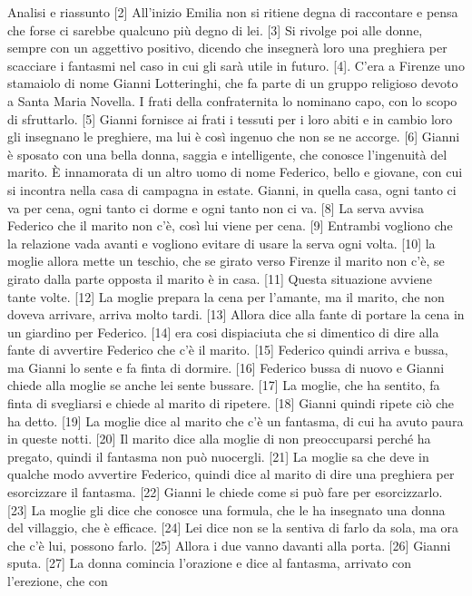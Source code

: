 \documentclass[preview]{standalone}
\begin{document}
Analisi e riassunto
[2] All'inizio Emilia non si ritiene degna di raccontare e pensa che forse ci sarebbe
qualcuno più degno di lei. [3] Si rivolge poi alle donne, sempre con un aggettivo positivo,
dicendo che insegnerà loro una preghiera per scacciare i fantasmi nel caso in cui gli sarà
utile in futuro. [4]. C'era a Firenze uno stamaiolo di nome Gianni Lotteringhi, che fa parte di
un gruppo religioso devoto a Santa Maria Novella. I frati della confraternita lo nominano
capo, con lo scopo di sfruttarlo. [5] Gianni fornisce ai frati i tessuti per i loro abiti e in
cambio loro gli insegnano le preghiere, ma lui è così ingenuo che non se ne accorge. [6]
Gianni è sposato con una bella donna, saggia e intelligente, che conosce l'ingenuità del
marito. È innamorata di un altro uomo di nome Federico, bello e giovane, con cui si
incontra nella casa di campagna in estate. Gianni, in quella casa, ogni tanto ci va per
cena, ogni tanto ci dorme e ogni tanto non ci va. [8] La serva avvisa Federico che il marito
non c'è, così lui viene per cena. [9] Entrambi vogliono che la relazione vada avanti e
vogliono evitare di usare la serva ogni volta. [10] la moglie allora mette un teschio, che se
girato verso Firenze il marito non c'è, se girato dalla parte opposta il marito è in casa. [11]
Questa situazione avviene tante volte. [12] La moglie prepara la cena per l'amante, ma il
marito, che non doveva arrivare, arriva molto tardi. [13] Allora dice alla fante di portare la
cena in un giardino per Federico. [14] era cosi dispiaciuta che si dimentico di dire alla fante
di avvertire Federico che c'è il marito. [15] Federico quindi arriva e bussa, ma Gianni lo
sente e fa finta di dormire. [16] Federico bussa di nuovo e Gianni chiede alla moglie se
anche lei sente bussare. [17] La moglie, che ha sentito, fa finta di svegliarsi e chiede al
marito di ripetere. [18] Gianni quindi ripete ciò che ha detto. [19] La moglie dice al marito
che c'è un fantasma, di cui ha avuto paura in queste notti. [20] Il marito dice alla moglie di
non preoccuparsi perché ha pregato, quindi il fantasma non può nuocergli. [21] La moglie
sa che deve in qualche modo avvertire Federico, quindi dice al marito di dire una
preghiera per esorcizzare il fantasma. [22] Gianni le chiede come si può fare per
esorcizzarlo. [23] La moglie gli dice che conosce una formula, che le ha insegnato una
donna del villaggio, che è efficace. [24] Lei dice non se la sentiva di farlo da sola, ma ora
che c'è lui, possono farlo. [25] Allora i due vanno davanti alla porta. [26] Gianni sputa. [27]
La donna comincia l'orazione e dice al fantasma, arrivato con l'erezione, che con
\end{document}
